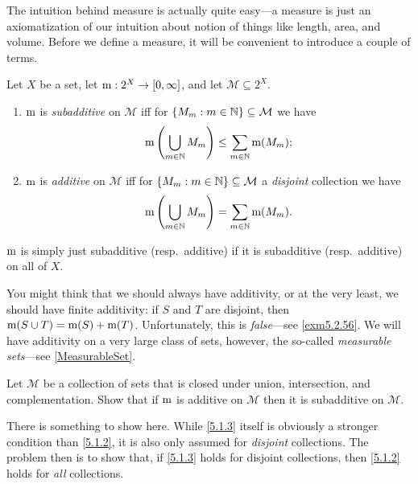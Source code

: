 The intuition behind measure is actually quite easy---a measure is just an axiomatization of our intuition about notion of things like length, area, and volume.  Before we define a measure, it will be convenient to introduce a couple of terms.
\begin{dfn}
Let $X$ be a set, let $\mathrm{m} :2^X\rightarrow [0,\infty ]$, and let $\mathcal{M}\subseteq 2^X$.  
\begin{enumerate}
\item $\mathrm{m}$ is \emph{subadditive} on $\mathcal{M}$ iff for $\{ M_m:m\in \mathbb{N} \} \subseteq \mathcal{M}$ we have
\begin{equation}\label{5.1.2}
\mathrm{m} \left( \bigcup _{m\in \mathbb{N}}M_m\right) \leq \sum _{m\in \mathbb{N}}\mathrm{m} (M_m);
\end{equation}
\item $\mathrm{m}$ is \emph{additive} on $\mathcal{M}$ iff for $\{ M_m:m\in \mathbb{N} \} \subseteq \mathcal{M}$ a \emph{disjoint} collection we have
\begin{equation}\label{5.1.3}
\mathrm{m} \left( \bigcup _{m\in \mathbb{N}}M_m\right) =\sum _{m\in \mathbb{N}}\mathrm{m} (M_m).
\end{equation}
\end{enumerate}
$\mathrm{m}$ is simply just subadditive (resp.~additive) if it is subadditive (resp.~additive) on all of $X$.
\begin{rmk}
You might think that we should always have additivity, or at the very least, we should have finite additivity:  if $S$ and $T$ are disjoint, then $\mathrm{m} (S\cup T)=\mathrm{m} (S)+\mathrm{m} (T)$.  Unfortunately, this is \emph{false}---see \cref{exm5.2.56}.  We will have additivity on a very large class of sets, however, the so-called \emph{measurable sets}---see \cref{MeasurableSet}.
\end{rmk}
\end{dfn}
\begin{exr}\label{exr5.1.4}
Let $\mathcal{M}$ be a collection of sets that is closed under union, intersection, and complementation.  Show that if $\mathrm{m}$ is additive on $\mathcal{M}$ then it is subadditive on $\mathcal{M}$.
\begin{rmk}
There is something to show here.  While \eqref{5.1.3} itself is obviously a stronger condition than \eqref{5.1.2}, it is also only assumed for \emph{disjoint} collections.  The problem then is to show that, if \eqref{5.1.3} holds for disjoint collections, then \eqref{5.1.2} holds for \emph{all} collections.
\end{rmk}
\end{exr}

